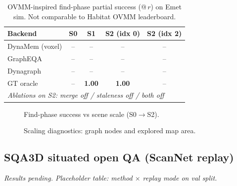 \begin{table}[t]
  \centering
  \caption{OVMM-inspired find-phase partial success (@\,$r$) on Emet sim. Not comparable to Habitat OVMM leaderboard.}
  \label{tab:ovmm_find_backend_tier}
  \small
  \begin{tabular}{@{}lcccc@{}}
    \toprule
    Backend & S0 & S1 & S2 (idx 0) & S2 (idx 2) \\
    \midrule
    DynaMem (voxel) & -- & -- & -- & -- \\
    GraphEQA & -- & -- & -- & -- \\
    Dynagraph & -- & -- & -- & -- \\
    GT oracle & -- & \textbf{1.00} & \textbf{1.00} & -- \\
    \midrule
    \multicolumn{5}{l}{\textit{Ablations on S2: merge off / staleness off / both off}} \\
    \bottomrule
  \end{tabular}
\end{table}

\begin{figure}[t]
  \centering
  \caption{Find-phase success vs scene scale (S0$\rightarrow$S2).}
  \label{fig:ovmm_scaling_success}
\end{figure}

\begin{figure}[t]
  \centering
  \caption{Scaling diagnostics: graph nodes and explored map area.}
  \label{fig:ovmm_scaling_nodes}
\end{figure}

\subsection{SQA3D situated open QA (ScanNet replay)}
\label{sec:sqa3d_results}

\textit{Results pending. Placeholder table: method $\times$ replay mode on val split.}

